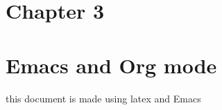 \documentclass{mimosis}
\numberwithin{equation}{chapter}
\numberwithin{listing}{chapter}
\begin{document}
\chapter[Conclusion]{Chapter 3}
\label{sec:org59b1f11}
\appendix
\chapter{Emacs and Org mode}
\label{sec:org9aba697}
this document is made using \gls{latex} and Emacs

\backmatter
\begingroup
    \let\clearpage\relax
    \glsaddall
    \printglossary[type=\acronymtype]
    \newpage
    \printglossary
\endgroup
\printindex

\printbibliography
\end{document}
